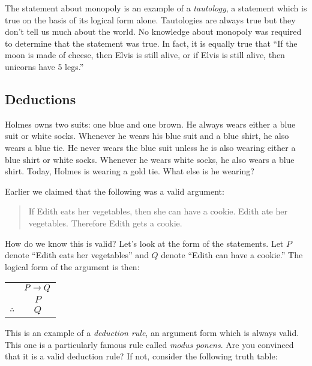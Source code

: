 \documentclass[12pt]{article}
\begin{document}
The statement about monopoly is an example of a \emph{tautology}, a statement which is true on the basis of its logical form alone.  Tautologies are always true but they don't tell us much about the world.  No knowledge about monopoly was required to determine that the statement was true.  In fact, it is equally true that ``If the moon is made of cheese, then Elvis is still alive, or if Elvis is still alive, then unicorns have 5 legs.''



\subsection{Deductions}

\begin{activity}
Holmes owns two suits: one blue and one brown.  He always wears either a blue suit or white socks.  Whenever he wears his blue suit and a blue shirt, he also wears a blue tie.  He never wears the blue suit unless he is also wearing either a blue shirt or white socks.  Whenever he wears white socks, he also wears a blue shirt.  Today, Holmes is wearing a gold tie.  What else is he wearing?\footnotemark

\end{activity}

Earlier we claimed that the following was a valid argument:
\begin{quote}
 If Edith eats her vegetables, then she can have a cookie.  Edith ate her vegetables.  Therefore Edith gets a cookie.
\end{quote}

How do we know this is valid?  Let's look at the form of the statements.  Let $P$ denote ``Edith eats her vegetables'' and $Q$ denote ``Edith can have a cookie.''  The logical form of the argument is then:

\begin{center}
 \begin{tabular}{rc}
  & $P \rightarrow Q$ \\
  & $P$ \\ \hline
  $\therefore$ & $Q$
 \end{tabular}
\end{center}

This is an example of a {\em deduction rule}, an argument form which is always valid.  This one is a particularly famous rule called {\em modus ponens}.  Are you convinced that it is a valid deduction rule?  If not, consider the following truth table:
\end{document}
